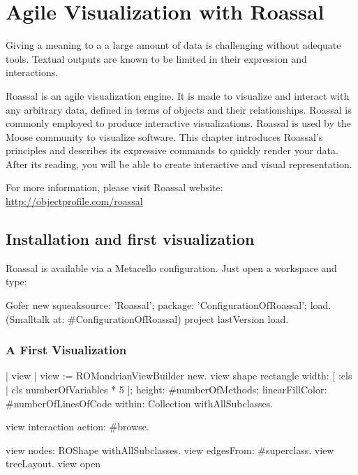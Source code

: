 \documentclass[a4paper,10pt,twoside]{book}
\begin{document}
\fi
\sloppy
\chapter{Agile Visualization with Roassal}


Giving a meaning to a a large amount of data is challenging without adequate tools. Textual outputs are known to be limited in their expression and interactions. 

Roassal is an agile visualization engine. It is made to visualize and interact with any arbitrary data, defined in terms of objects and their relationships. Roassal is commonly employed to produce interactive visualizations. Roassal is used by the Moose community to visualize software. This chapter introduces Roassal's principles and describes its expressive commands to quickly render your data. After its reading, you will be able to create interactive and visual representation.

For more information, please visit Roassal website: \url{http://objectprofile.com/roassal}

\section{Installation and first visualization}

Roassal is available via a Metacello configuration. Just open a workspace and type:
\begin{code}{}
Gofer new
	squeaksource: 'Roassal'; 
	package: 'ConfigurationOfRoassal';
	load.
(Smalltalk at: #ConfigurationOfRoassal) project lastVersion load.
\end{code}


\subsection{A First Visualization}
\begin{code}{}
| view |
view := ROMondrianViewBuilder new.
view shape rectangle 
	width:  [ :cls | cls numberOfVariables * 5 ];  
	height: #numberOfMethods;
	linearFillColor: #numberOfLinesOfCode within:  Collection withAllSubclasses.
		
view interaction action: #browse.

view nodes: ROShape withAllSubclasses.
view edgesFrom: #superclass.
view treeLayout.
view open
\end{code}
\end{document}
